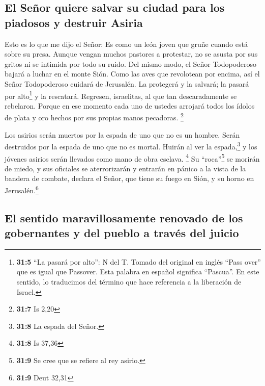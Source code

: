 \hypertarget{el-seuxf1or-quiere-salvar-su-ciudad-para-los-piadosos-y-destruir-asiria}{%
\subsection{El Señor quiere salvar su ciudad para los piadosos y
destruir
Asiria}\label{el-seuxf1or-quiere-salvar-su-ciudad-para-los-piadosos-y-destruir-asiria}}

 Esto es lo que me dijo el Señor: Es como un león joven
que gruñe cuando está sobre su presa. Aunque vengan muchos pastores a
protestar, no se asusta por sus gritos ni se intimida por todo su ruido.
Del mismo modo, el Señor Todopoderoso bajará a luchar en el monte Sión.
 Como las aves que revolotean por encima, así el Señor
Todopoderoso cuidará de Jerusalén. La protegerá y la salvará; la pasará
por alto\footnote{\textbf{31:5} ``La pasará por alto'': N del T. Tomado
  del original en inglés ``Pass over'' que es igual que Passover. Esta
  palabra en español significa ``Pascua''. En este sentido, lo
  traducimos del término que hace referencia a la liberación de Israel.}
y la rescatará.  Regresen, israelitas, al que tan
descaradamente se rebelaron.  Porque en ese momento cada
uno de ustedes arrojará todos los ídolos de plata y oro hechos por sus
propias manos pecadoras. \footnote{\textbf{31:7} Is 2,20}

 Los asirios serán muertos por la espada de uno que no es
un hombre. Serán destruidos por la espada de uno que no es mortal.
Huirán al ver la espada,\footnote{\textbf{31:8} La espada del Señor.} y
los jóvenes asirios serán llevados como mano de obra esclava.
\footnote{\textbf{31:8} Is 37,36}  Su ``roca''\footnote{\textbf{31:9}
  Se cree que se refiere al rey asirio.} se morirán de miedo, y sus
oficiales se aterrorizarán y entrarán en pánico a la vista de la bandera
de combate, declara el Señor, que tiene su fuego en Sión, y su horno en
Jerusalén.\footnote{\textbf{31:9} Deut 32,31}

\hypertarget{el-sentido-maravillosamente-renovado-de-los-gobernantes-y-del-pueblo-a-travuxe9s-del-juicio}{%
\subsection{El sentido maravillosamente renovado de los gobernantes y
del pueblo a través del
juicio}\label{el-sentido-maravillosamente-renovado-de-los-gobernantes-y-del-pueblo-a-travuxe9s-del-juicio}}

